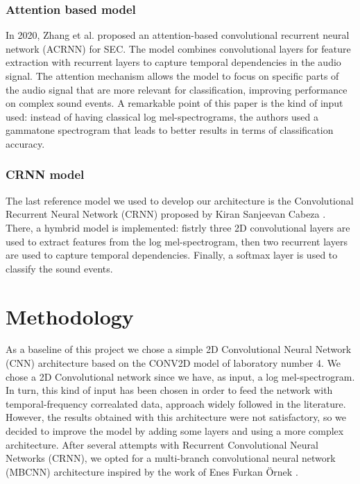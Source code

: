 \documentclass{article}
\begin{document}
\begin{sloppy}
\subsubsection{Attention based model}
\label{sec:attention_based_model}
In 2020, Zhang et al. \cite{zhang2019attentionbasedconvolutionalrecurrent} proposed an attention-based convolutional recurrent neural network (ACRNN) for SEC.
The model combines convolutional layers for feature extraction with recurrent layers to capture temporal dependencies in the audio signal.
The attention mechanism allows the model to focus on specific parts of the audio signal that are more relevant for classification, improving performance on complex sound events.
A remarkable point of this paper is the kind of input used: instead of having classical log mel-spectrograms, the authors used a gammatone spectrogram that leads
to better results in terms of classification accuracy.

\subsubsection{CRNN model}
\label{sec:CRNN_model}
The last reference model we used to develop our architecture is the Convolutional Recurrent Neural Network (CRNN) proposed by Kiran Sanjeevan Cabeza \cite{crnn_audio_classification}.
There, a hymbrid model is implemented: fistrly three 2D convolutional layers are used to extract features from the log mel-spectrogram, then two recurrent layers are used to capture temporal dependencies.
Finally, a softmax layer is used to classify the sound events.


\section{Methodology}
\label{sec:methodology}
As a baseline of this project we chose a simple 2D Convolutional Neural Network (CNN) architecture based on the CONV2D model of laboratory number 4.
We chose a 2D Convolutional network since we have, as input, a log mel-spectrogram. In turn, this kind of input has been chosen in order to feed the network with
temporal-frequency correalated data, approach widely followed in the literature. However, the results obtained with this architecture were not satisfactory,
so we decided to improve the model by adding some layers and using a more complex architecture. After several attempts with Recurrent Convolutional Neural Networks (CRNN),
we opted for a multi-branch convolutional neural network (MBCNN) architecture inspired by the work of Enes Furkan Örnek \cite{audio_classification_esc50, latifi2025classificationheartsoundsusing}.


\end{sloppy}
\end{document}
